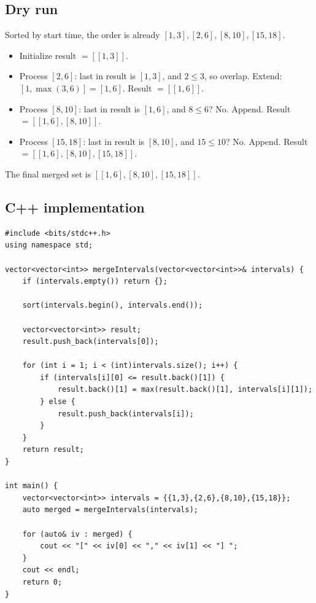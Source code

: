 \subsection*{Dry run}


Sorted by start time, the order is already
$[1,3],[2,6],[8,10],[15,18]$.

\begin{itemize}
  \item Initialize result $= [[1,3]]$.
  \item Process $[2,6]$: last in result is $[1,3]$, and $2 \le 3$, so
        overlap. Extend: $[1, \max(3,6)] = [1,6]$. Result $= [[1,6]]$.
  \item Process $[8,10]$: last in result is $[1,6]$, and $8 \le 6$? No.
        Append. Result $= [[1,6],[8,10]]$.
  \item Process $[15,18]$: last in result is $[8,10]$, and $15 \le 10$?
        No. Append. Result $= [[1,6],[8,10],[15,18]]$.
\end{itemize}

The final merged set is $[[1,6],[8,10],[15,18]]$.

\subsection*{C++ implementation}

\begin{lstlisting}
#include <bits/stdc++.h>
using namespace std;

vector<vector<int>> mergeIntervals(vector<vector<int>>& intervals) {
    if (intervals.empty()) return {};

    sort(intervals.begin(), intervals.end());

    vector<vector<int>> result;
    result.push_back(intervals[0]);

    for (int i = 1; i < (int)intervals.size(); i++) {
        if (intervals[i][0] <= result.back()[1]) {
            result.back()[1] = max(result.back()[1], intervals[i][1]);
        } else {
            result.push_back(intervals[i]);
        }
    }
    return result;
}

int main() {
    vector<vector<int>> intervals = {{1,3},{2,6},{8,10},{15,18}};
    auto merged = mergeIntervals(intervals);

    for (auto& iv : merged) {
        cout << "[" << iv[0] << "," << iv[1] << "] ";
    }
    cout << endl;
    return 0;
}
\end{lstlisting}

